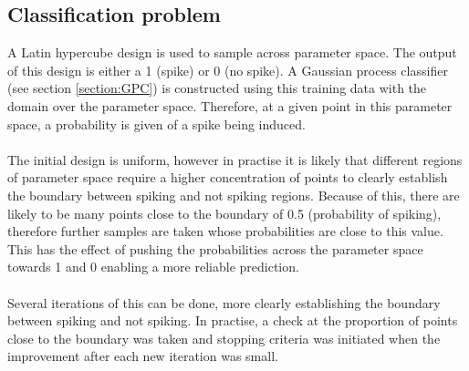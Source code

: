 \documentclass{article}
\begin{document}
\subsection{Classification problem}
\label{method-class}
A Latin hypercube design \citep{lhs} is used to sample across parameter space. The output of this design is either a 1 (spike) or 0 (no spike). A Gaussian process classifier (see section \ref{section:GPC}) is constructed using this training data with the domain over the parameter space. Therefore, at a given point in this parameter space, a probability is given of a spike being induced.\\\\
The initial design is uniform, however in practise it is likely that different regions of parameter space require a higher concentration of points to clearly establish the boundary between spiking and not spiking regions. Because of this, there are likely to be many points close to the boundary of 0.5 (probability of spiking), therefore further samples are taken whose probabilities are close to this value. This has the effect of pushing the probabilities across the parameter space towards 1 and 0 enabling a more reliable prediction.\\\\
Several iterations of this can be done, more clearly establishing the boundary between spiking and not spiking. In practise, a check at the proportion of points close to the boundary was taken and stopping criteria was initiated when the improvement after each new iteration was small. 
\end{document}
